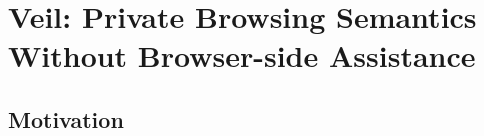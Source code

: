\section{Veil: Private Browsing Semantics Without Browser-side Assistance}
\label{chap:veil}

\subsection{Motivation}
